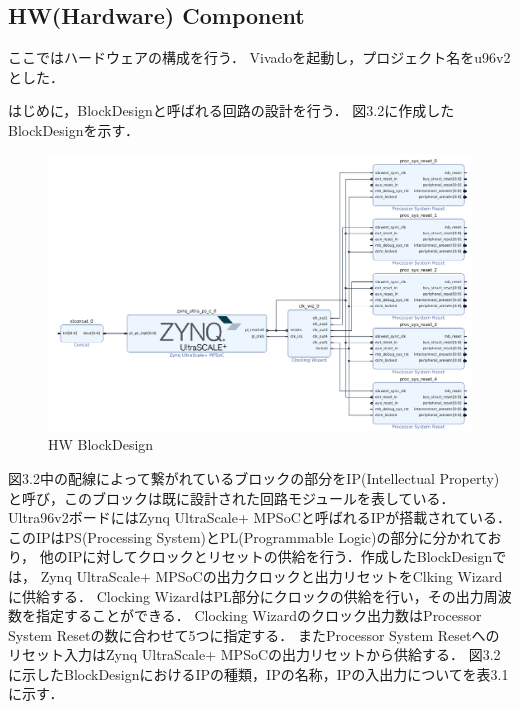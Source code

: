 \documentclass[11pt,a4j]{jreport}
\begin{document}
\subsection{HW(Hardware) Component}
ここではハードウェアの構成を行う．
Vivadoを起動し，プロジェクト名をu96v2とした．

はじめに，BlockDesignと呼ばれる回路の設計を行う．
図3.2に作成したBlockDesignを示す．
\begin{figure}[H]
  \center
  \includegraphics[scale = 0.4]{pict/pict2.jpg}
  \caption{HW BlockDesign}
\end{figure}
図3.2中の配線によって繋がれているブロックの部分をIP(Intellectual Property)
と呼び，このブロックは既に設計された回路モジュールを表している．
Ultra96v2ボードにはZynq UltraScale+ MPSoCと呼ばれるIPが搭載されている．
このIPはPS(Processing System)とPL(Programmable Logic)の部分に分かれており，
他のIPに対してクロックとリセットの供給を行う．作成したBlockDesignでは，
Zynq UltraScale+ MPSoCの出力クロックと出力リセットをClking Wizardに供給する．
Clocking WizardはPL部分にクロックの供給を行い，その出力周波数を指定することができる．
Clocking Wizardのクロック出力数はProcessor System Resetの数に合わせて5つに指定する．
またProcessor System Resetへのリセット入力はZynq UltraScale+ MPSoCの出力リセットから供給する．
図3.2に示したBlockDesignにおけるIPの種類，IPの名称，IPの入出力についてを表3.1に示す．
\end{document}
